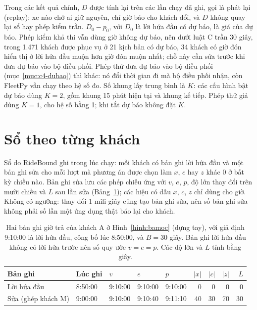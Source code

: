 Trong các kết quả chính, $D$ được tính lại trên các lần chạy đã ghi, gọi là phát lại (replay): xe nào chở ai giữ
nguyên, chỉ giờ báo cho khách đổi, và $D$ không quay lại sổ hay phép kiểm trần. $D_0 - p_0$, với $D_0$ là lời hứa
đầu có dự báo, là giá của dự báo. Phép kiểm khả thi vẫn dùng giờ không dự báo, nên dưới luật C trần 30 giây, trong
1.471 khách được phục vụ ở 21 kịch bản có dự báo, 34 khách có giờ đón hiển thị ở lời hứa đầu muộn hơn giờ đón
muộn nhất; chỗ này cần sửa trước khi đưa dự báo vào bộ điều phối. Phép thử đưa dự báo vào bộ điều phối
(mục~\ref{muc:c4-dubao}) thì khác: nó đổi thời gian đi mà bộ điều phối nhận, còn FleetPy vẫn chạy theo hệ số đo.
Số khung lấy trung bình là $K$: các cấu hình bật dự báo dùng $K = 2$, gồm khung 15 phút hiện tại và khung kế tiếp.
Phép thử giả dùng $K = 1$, cho hệ số bằng 1; khi tắt dự báo không đặt $K$.

\section{Sổ theo từng khách}
\label{muc:so}

Sổ do RideBound ghi trong lúc chạy: mỗi khách có bản ghi lời hứa đầu và một bản ghi sửa cho mỗi lượt mà phương án
được chọn làm $x$, $c$ hay $z$ khác 0 ở bất kỳ chiều nào. Bản ghi sửa lưu các phép chiếu ứng với $v$, $e$, $p$,
độ lớn thay đổi trên mười chiều và $L$ sau lần sửa (Bảng~\ref{bang:vidu-so}); các hiệu có dấu $x$, $c$, $z$ chỉ dùng
cho giờ. Không có ngưỡng: thay đổi 1 mili giây cũng tạo bản ghi sửa, nên số bản ghi sửa không phải số lần một ứng
dụng thật báo lại cho khách.

\begin{table}[htbp]
\centering
\caption{Hai bản ghi giờ trả của khách A ở Hình~\ref{hinh:bamoc} (dựng tay), với giả định 9:10:00 là lời hứa đầu,
công bố lúc 8:50:00, và $B = 30$ giây. Bản ghi lời hứa đầu không có lời hứa trước nên sổ quy ước $v = e = p$. Các
độ lớn và $L$ tính bằng giây.}
\label{bang:vidu-so}
\small
\begin{tabular}{@{}lllllrrrr@{}}
\toprule
\textbf{Bản ghi} & \textbf{Lúc ghi} & $v$ & $e$ & $p$ & $|x|$ & $|c|$ & $|z|$ & $L$\\
\midrule
Lời hứa đầu & 8:50:00 & 9:10:00 & 9:10:00 & 9:10:00 & 0 & 0 & 0 & 0\\
Sửa (ghép khách M) & 9:00:00 & 9:10:00 & 9:10:40 & 9:11:10 & 40 & 30 & 70 & 30\\
\bottomrule
\end{tabular}
\end{table}

